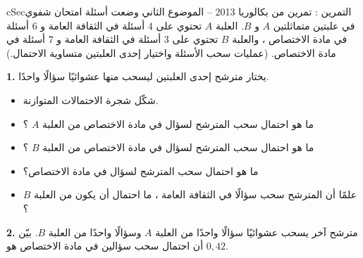 \documentclass[12pt,a4paper]{article}
\newenvironment{BOX}[2]{\begin{otherlanguage}{english}\begin{arbox}{#1}{#2}}{\end{arbox}\end{otherlanguage}}
\newcounter{exo}
\newenvironment{tamrin}[1]{\stepcounter{exo}\begin{BOX}{cSec}{التمرين \theexo: #1}}{\end{BOX}}
\newenvironment{sq}{\begin{itemize}[leftmargin=2.4em,itemsep=3pt]}{\end{itemize}}
\newcommand{\qa}{\item[(أ)]}\newcommand{\qb}{\item[(ب)]}\newcommand{\qc}{\item[(جـ)]}\newcommand{\qd}{\item[(د)]}\newcommand{\qe}{\item[(هـ)]}
\newcommand{\QQ}[1]{\par\smallskip\textbf{#1.} }
\begin{document}
\begin{tamrin}{تمرين من بكالوريا 2013 -- الموضوع الثاني}
وضعت أسئلة امتحان شفوي في علبتين متماثلتين $A$ و $B$. العلبة $A$ تحتوي على $4$ أسئلة في الثقافة العامة و $6$ أسئلة في مادة الاختصاص ، والعلبة $B$ تحتوي على $3$ أسئلة في الثقافة العامة و $7$ أسئلة في مادة الاختصاص. (عمليات سحب الأسئلة واختيار إحدى العلبتين متساوية الاحتمال.)
\QQ{1} يختار مترشح إحدى العلبتين ليسحب منها عشوائيًا سؤالًا واحدًا.
\begin{sq}
\qa شكّل شجرة الاحتمالات المتوازنة.
\qb ما هو احتمال سحب المترشح لسؤال في مادة الاختصاص من العلبة $A$ ؟
\qc ما هو احتمال سحب المترشح لسؤال في مادة الاختصاص من العلبة $B$ ؟
\qd ما هو احتمال سحب المترشح لسؤال في مادة الاختصاص؟
\qe علمًا أن المترشح سحب سؤالًا في الثقافة العامة ، ما احتمال أن يكون من العلبة $B$ ؟
\end{sq}
\QQ{2} مترشح آخر يسحب عشوائيًا سؤالًا واحدًا من العلبة $A$ وسؤالًا واحدًا من العلبة $B$. بيّن أن احتمال سحب سؤالين في مادة الاختصاص هو $0{,}42$.
\end{tamrin}
\end{document}
